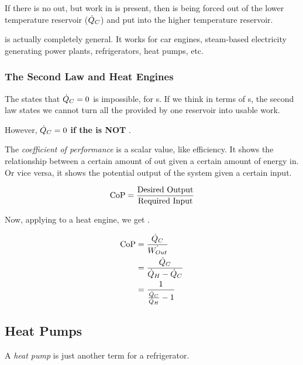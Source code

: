 If there is no  out, but work in is present, then  is being forced out of the lower temperature reservoir ($\dot{Q}_{C}$) and put into the higher temperature reservoir.

 is actually completely general.
It works for car engines, steam-based electricity generating power plants, refrigerators, heat pumps, etc.

\subsubsection{The Second Law and Heat Engines}\label{subsubsec:2nd_Law_Heat_Engines}
The  states that $\dot{Q}_{C} = 0$ is impossible, for s.
If we think in terms of s, the second law states we cannot turn all the  provided by one reservoir into usable work.

However, $\dot{Q}_{C} = 0$ \textbf{if the  is NOT }.

\begin{definition}\label{def:Coefficient_of_Performance}
  The \emph{coefficient of performance} is a scalar value, like efficiency.
  It shows the relationship between a certain amount of  out given a certain amount of energy in.
  Or vice versa, it shows the potential output of the system given a certain input.

  \begin{equation}\label{eq:Coefficient_of_Performance}
    \text{CoP} = \frac{\text{Desired Output}}{\text{Required Input}}
  \end{equation}
\end{definition}

Now, applying  to a heat engine, we get .

\begin{equation}\label{eq:Coefficient_of_Performance-Heat_Engine}
  \begin{aligned}
    \text{CoP} &= \frac{\dot{Q}_{C}}{\dot{W_{Out}}} \\
    &= \frac{\dot{Q}_{C}}{\dot{Q}_{H} - \dot{Q}_{C}} \\
    &= \frac{1}{\frac{\dot{Q}_{C}}{\dot{Q}_{H}} - 1}
  \end{aligned}
\end{equation}

\subsection{Heat Pumps}\label{subsec:Heat_Pumps}
\begin{definition}\label{def:Heat_Pump}
  A \emph{heat pump} is just another term for a refrigerator.
\end{definition}

